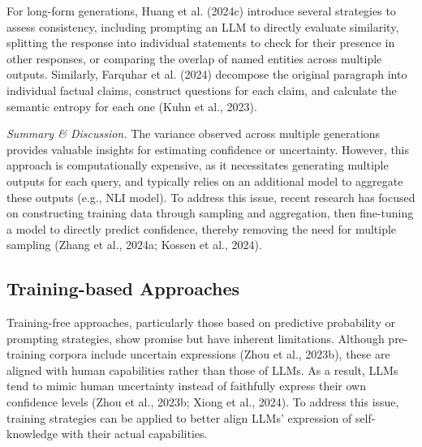For long-form generations, Huang et al. (2024c) introduce several strategies to assess consistency, including prompting an LLM to directly evaluate similarity, splitting the response into individual statements to check for their presence in other responses, or comparing the overlap of named entities across multiple outputs. Similarly, Farquhar et al. (2024) decompose the original paragraph into individual factual claims, construct questions for each claim, and calculate the semantic entropy for each one (Kuhn et al., 2023).

\emph{Summary \& Discussion.} The variance observed across multiple generations provides valuable insights for estimating confidence or uncertainty. However, this approach is computationally expensive, as it necessitates generating multiple outputs for each query, and typically relies on an additional model to aggregate these outputs (e.g., NLI model). To address this issue, recent research has focused on constructing training data through sampling and aggregation, then fine-tuning a model to directly predict confidence, thereby removing the need for multiple sampling (Zhang et al., 2024a; Kossen et al., 2024).

\subsection{Training-based Approaches}
\label{sec:sk_training_based}

Training-free approaches, particularly those based on predictive probability or prompting strategies, show promise but have inherent limitations. Although pre-training corpora include uncertain expressions (Zhou et al., 2023b), these are aligned with human capabilities rather than those of LLMs. As a result, LLMs tend to mimic human uncertainty instead of faithfully express their own confidence levels (Zhou et al., 2023b; Xiong et al., 2024). To address this issue, training strategies can be applied to better align LLMs' expression of self-knowledge with their actual capabilities.

